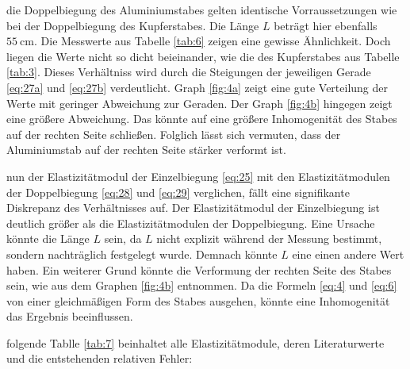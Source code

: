\justifying die Doppelbiegung des Aluminiumstabes gelten identische Vorraussetzungen wie bei der Doppelbiegung des Kupferstabes.
Die Länge $L$ beträgt hier ebenfalls $\SI{55}{\centi\meter}$. Die Messwerte aus Tabelle \ref{tab:6} zeigen eine gewisse Ähnlichkeit. Doch liegen 
die Werte nicht so dicht beieinander, wie die des Kupferstabes aus Tabelle \ref{tab:3}. Dieses Verhältniss wird durch die Steigungen der jeweiligen
Gerade \eqref{eq:27a} und \eqref{eq:27b} verdeutlicht. Graph \ref{fig:4a} zeigt eine gute Verteilung der Werte mit geringer Abweichung zur Geraden.
Der Graph \ref{fig:4b} hingegen zeigt eine größere Abweichung. Das könnte auf eine größere Inhomogenität des Stabes auf der rechten Seite schließen. 
Folglich lässt sich vermuten, dass der Aluminiumstab auf der rechten Seite stärker verformt ist. 

\justifying nun der Elastizitätmodul der Einzelbiegung \eqref{eq:25} mit den Elastizitätmodulen der Doppelbiegung \eqref{eq:28}
und \eqref{eq:29} verglichen, fällt eine signifikante Diskrepanz des Verhältnisses auf. Der Elastizitätmodul der Einzelbiegung ist deutlich größer
als die Elastizitätmodulen der Doppelbiegung. Eine Ursache könnte die Länge $L$ sein, da $L$ nicht explizit während der Messung bestimmt, sondern 
nachträglich festgelegt wurde. Demnach könnte $L$ eine einen andere Wert haben. Ein weiterer Grund könnte die Verformung der rechten Seite des Stabes
sein, wie aus dem Graphen \ref{fig:4b} entnommen. Da die Formeln \eqref{eq:4} und \eqref{eq:6} von einer gleichmäßigen Form des Stabes ausgehen, 
könnte eine Inhomogenität das Ergebnis beeinflussen.

\justifying folgende Tablle \ref{tab:7} beinhaltet alle Elastizitätmodule, deren Literaturwerte \cite{E_CuAl_Lit} und die entstehenden 
relativen Fehler:


